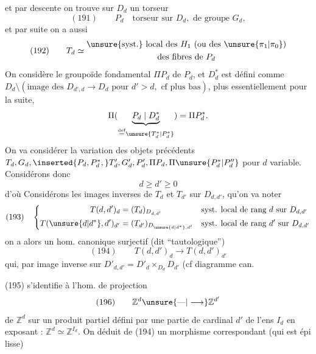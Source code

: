 et par descente on trouve sur $D_d$ un torseur
\[
(191)\qquad P_d\quad\text{torseur sur }D_d,\text{ de groupe }G_d,
\]
et par suite on a aussi
\[
(192)\qquad T_d\simeq\begin{gathered}\text{\unsure{syst.} local des }H_1\text{ (ou des }\unsure{\pi_1|\pi_0}\text{)}\\\text{des fibres de }P_d
\end{gathered}
\]
On considère le groupoïde fondamental $\Pi P_d$ de $P_d$, et   $D_d^*$ est défini comme $D_d\setminus(\text{image des }D_{d',d}\longrightarrow D_d\text{ pour }d'>d,\text{ cf plus bas})$, plus essentiellement pour la suite,
\[
\Pi(\underbrace{P_d\mid D_d^*}_{\overset{\mathrm{def}}{=}\unsure{T_d^*|P_d^*}})=\Pi P_d^*.
\]
On va considérer la variation des objets précédents $T_d,G_d,\inserted{P_d,P_d^*,}T'_d,G'_d,P'_d,\Pi P_d,\Pi\unsure{P_d^*|P''_d}$  pour $d$ variable. Considérons donc
\[
d\geq d'\geq0
\]
d'où 
Considérons les images inverses de $T_d$ et $T_{d'}$ sur $D_{d,d'}$, qu'on va noter
\[
(193)\quad\left\{\begin{aligned}
T(d,d')_d&=(T_d)_{D_{d,d'}}&&\text{syst. local de rang }d\text{ sur }D_{d,d'}\\
T(\unsure{d|d^*},d')_{d'}&=(T_{d'})_{D_{\unsure{d|d^*},d'}}&&\text{syst. local de rang }d'\text{ sur }D_{d,d'}
\end{aligned}\right.
\]
on a alors un hom. canonique surjectif (dit ``tautologique'')
\[
(194)\qquad T(d,d')_d\longrightarrow T(d,d')_{d'}
\]
qui, par image inverse sur $D'_{d,d'}=D'_d\mathbin\times_{D_d}D_{d'}$ (cf diagramme can.

(195)\quad
{}
s'identifie à l'hom. de projection
\[
(196)\qquad\mathbb Z^d\unsure{\text{---}|\longrightarrow}\mathbb Z^{d'}
\]
de $\mathbb Z^d$ sur un produit partiel défini par une partie de cardinal $d'$ de l'ens $I_d$ en exposant : $\mathbb Z^d\simeq\mathbb Z^{I_d}$.
On déduit de (194) un morphisme correspondant (qui est épi lisse)


